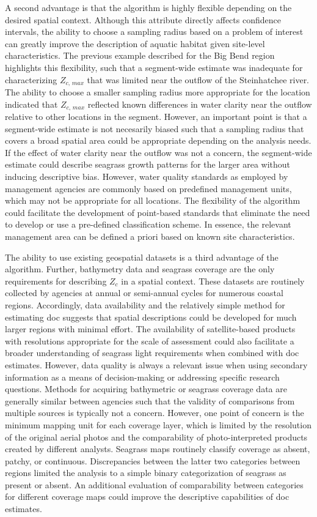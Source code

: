 \documentclass[letterpaper,12pt,oneside]{article}\usepackage[]{graphicx}\usepackage[]{color}
\begin{document}
A second advantage is that the algorithm is highly flexible depending on the desired spatial context.  Although this attribute directly affects confidence intervals, the ability to choose a sampling radius based on a problem of interest can greatly improve the description of aquatic habitat given site-level characteristics.  The previous example described for the Big Bend region highlights this flexibility, such that a segment-wide estimate was inadequate for characterizing $Z_{c,\,max}$ that was limited near the outflow of the Steinhatchee river.  The ability to choose a smaller sampling radius more appropriate for the location indicated that $Z_{c,\,max}$ reflected known differences in water clarity near the outflow relative to other locations in the segment.  However, an important point is that a segment-wide estimate is not necesarily biased such that a sampling radius that covers a broad spatial area could be appropriate depending on the analysis needs.  If the effect of water clarity near the outflow was not a concern, the segment-wide estimate could describe seagrass growth patterns for the larger area without inducing descriptive bias.  However, water quality standards as employed by management agencies are commonly based on predefined management units, which may not be appropriate for all locations.  The flexibility of the algorithm could facilitate the development of point-based standards that eliminate the need to develop or use a pre-defined classification scheme.  In essence, the relevant management area can be defined a priori based on known site characteristics.

The ability to use existing geospatial datasets is a third advantage of the algorithm.  Further, bathymetry data and seagrass coverage are the only requirements for describing $Z_c$ in a spatial context.  These datasets are routinely collected by agencies at annual or semi-annual cycles for numerous coastal regions.  Accordingly, data availability and the relatively simple method for estimating \ac{doc} suggests that spatial descriptions could be developed for much larger regions with minimal effort.  The availability of satellite-based products with resolutions appropriate for the scale of assessment could also facilitate a broader understanding of seagrass light requirements when combined with \ac{doc} estimates.  However, data quality is always a relevant issue when using secondary information as a means of decision-making or addressing specific research questions.  Methods for acquiring bathymetric or seagrass coverage data are generally similar between agencies such that the validity of comparisons from multiple sources is typically not a concern.  However, one point of concern is the minimum mapping unit for each coverage layer, which is limited by the resolution of the original aerial photos and the comparability of photo-interpreted products created by different analysts.  Seagrass maps routinely classify coverage as absent, patchy, or continuous.  Discrepancies between the latter two categories between regions limited the analysis to a simple binary categorization of seagrass as present or absent. An additional evaluation of comparability between categories for different coverage maps could improve the descriptive capabilities of \ac{doc} estimates.
\end{document}
